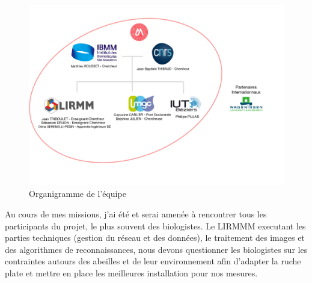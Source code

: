 \documentclass[11pt,french,a4paper]{report}
\begin{document}
\begin{figure}[!h]
    \centering 
    \includegraphics[width=15cm]{./img/orga.jpg}
    \caption{Organigramme de l'équipe}
    \label{orga_sbl}
\end{figure}

Au cours de mes missions, j'ai été et serai amenée à rencontrer tous les participants du projet, le plus souvent des biologistes.
Le LIRMMM executant les parties techniques (gestion du réseau et des données), le traitement des images et des algorithmes de reconnaissances, 
nous devons questionner les biologistes  sur les contraintes autours des abeilles et de leur environnement afin d'adapter la ruche plate et mettre 
en place les meilleures installation pour nos mesures. 
\end{document}
